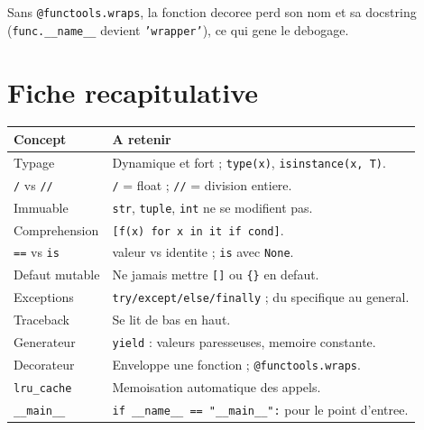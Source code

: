 \documentclass[11pt,a4paper]{article}
\begin{document}
\begin{piege}
Sans \texttt{@functools.wraps}, la fonction decoree perd son nom et sa docstring
(\texttt{func.\_\_name\_\_} devient \texttt{'wrapper'}), ce qui gene le debogage.
\end{piege}

\newpage
\section{Fiche recapitulative}
\renewcommand{\arraystretch}{1.35}
\begin{longtable}{>{\raggedright\arraybackslash}p{4.5cm}
                  >{\raggedright\arraybackslash}p{8.3cm}}
\rowcolor{primary}
\textbf{\color{white}Concept} & \textbf{\color{white}A retenir} \\
\hline
Typage            & Dynamique et fort ; \texttt{type(x)}, \texttt{isinstance(x, T)}. \\
\texttt{/} vs \texttt{//} & \texttt{/} = float ; \texttt{//} = division entiere. \\
Immuable          & \texttt{str}, \texttt{tuple}, \texttt{int} ne se modifient pas. \\
Comprehension     & \texttt{[f(x) for x in it if cond]}. \\
\texttt{==} vs \texttt{is} & valeur vs identite ; \texttt{is} avec \texttt{None}. \\
Defaut mutable    & Ne jamais mettre \texttt{[]} ou \texttt{\{\}} en defaut. \\
Exceptions        & \texttt{try/except/else/finally} ; du specifique au general. \\
Traceback         & Se lit de bas en haut. \\
Generateur        & \texttt{yield} : valeurs paresseuses, memoire constante. \\
Decorateur        & Enveloppe une fonction ; \texttt{@functools.wraps}. \\
\texttt{lru\_cache}   & Memoisation automatique des appels. \\
\texttt{\_\_main\_\_}   & \texttt{if \_\_name\_\_ == "\_\_main\_\_":} pour le point d'entree. \\
\end{longtable}
\end{document}
